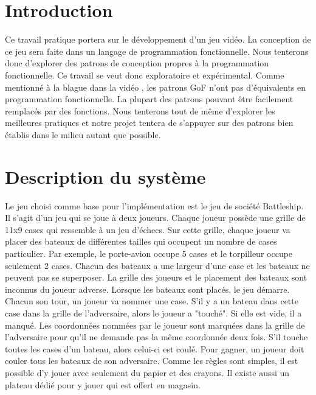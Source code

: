 \documentclass[12pt]{article}
\begin{document}

\section{Introduction}

Ce travail pratique portera sur le développement d'un jeu vidéo. La conception de ce jeu sera faite dans un langage de programmation fonctionnelle. Nous tenterons donc d'explorer des patrons de conception propres à la programmation fonctionnelle. Ce travail se veut donc exploratoire et expérimental. Comme mentionné à la blague dans la vidéo \cite{functional_video}, les patrons GoF n'ont pas d'équivalents en programmation fonctionnelle. La plupart des patrons pouvant être facilement remplacés par des fonctions. Nous tenterons tout de même d'explorer les meilleures pratiques et notre projet tentera de s'appuyer sur des patrons bien établis dans le milieu autant que possible.

\section{Description du système} 

Le jeu choisi comme base pour l'implémentation est le jeu de société Battleship. Il s'agit d'un jeu qui se joue à deux joueurs. Chaque joueur possède une grille de 11x9 cases qui ressemble à un jeu d'échecs. Sur cette grille, chaque joueur va placer des bateaux de différentes tailles qui occupent un nombre de cases particulier. Par exemple, le porte-avion occupe 5 cases et le torpilleur occupe seulement 2 cases. Chacun des bateaux a une largeur d'une case et les bateaux ne peuvent pas se superposer. La grille des joueurs et le placement des bateaux sont inconnus du joueur adverse. Lorsque les bateaux sont placés, le jeu démarre. Chacun son tour, un joueur va nommer une case. S’il y a un bateau dans cette case dans la grille de l'adversaire, alors le joueur a "touché". Si elle est vide, il a manqué. Les coordonnées nommées par le joueur sont marquées dans la grille de l'adversaire pour qu'il ne demande pas la même coordonnée deux fois. S'il touche toutes les cases d'un bateau, alors celui-ci est coulé. Pour gagner, un joueur doit couler tous les bateaux de son adversaire. Comme les règles sont simples, il est possible d'y jouer avec seulement du papier et des crayons. Il existe aussi un plateau dédié pour y jouer qui est offert en magasin. 
\end{document}

